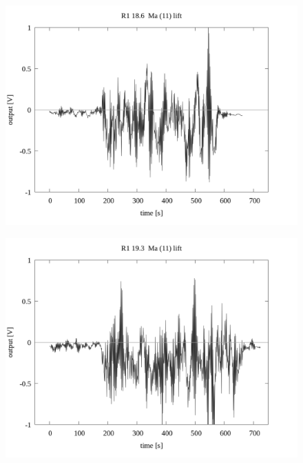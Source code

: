 \documentclass[a4paper]{jsarticle}
\begin{document}
\begin{figure}[htbp]
    \footnotesize
    \begin{center}
        \includegraphics[width=140mm]{../../../33_result/210806/moving_average/11/lift/01/R1_18.6_ma(11)_lift_01.png}
    \end{center}
\end{figure}

\begin{figure}[htbp]
    \footnotesize
    \begin{center}
        \includegraphics[width=140mm]{../../../33_result/210806/moving_average/11/lift/01/R1_19.3_ma(11)_lift_01.png}
    \end{center}
\end{figure}
\end{document}
